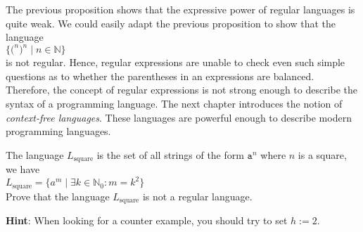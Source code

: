 \remark
The previous proposition shows that the expressive power of regular languages is quite weak.
We could easily adapt the previous proposition to show that the language
\\[0.2cm]
\hspace*{1.3cm}
$\bigl\{ \mathtt{(}^n \mathtt{)}^n \mid n \in \mathbb{N} \bigr\}$
\\[0.2cm]
is not regular.  Hence, regular expressions are unable to check even such simple questions as to
whether the parentheses in an expressions are balanced.  Therefore, the concept of regular
expressions is not strong enough to describe the syntax of a programming language.
The next chapter introduces the notion of \emph{context-free languages}.  These languages
are powerful enough to describe modern programming languages. 

\exerciseEng
The language  $L_{\mathrm{square}}$ is the set of all strings of the form $\mathtt{a}^n$ where $n$
is a square, we have
\\[0.2cm]
\hspace*{1.3cm}
$L_{\mathrm{square}} = \bigl\{ a^{m} \mid \exists k \in \mathbb{N}_0: m = k^2 \bigr\}$
\\[0.2cm]
Prove that the language  $L_{\mathrm{square}}$ is not a regular language.
\eox
\vspace*{0.1cm}

\noindent
\textbf{Hint}:  When looking for a counter example, you should try to set $h:=2$.


